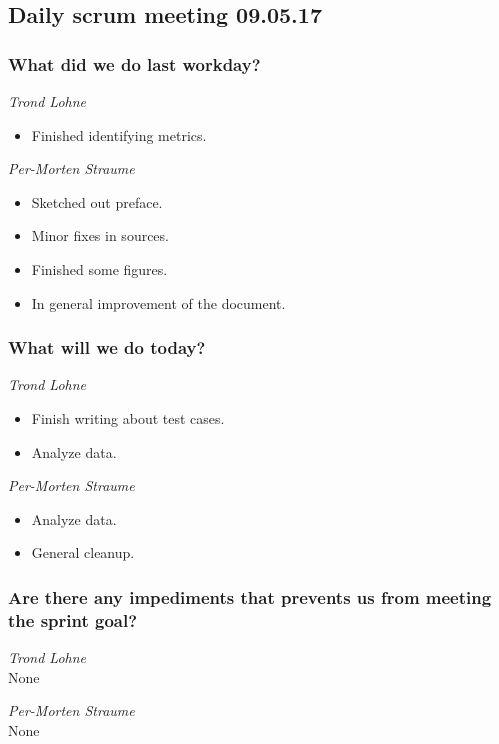 \documentclass{article}
\begin{document}
\begin{center}
\subsection*{Daily scrum meeting 09.05.17}
\end{center}
\bigskip


\subsubsection*{What did we do last workday?}

\noindent\textit{Trond Lohne}
\begin{itemize}
	\item
	Finished identifying metrics.
\end{itemize}

\medskip

\noindent\textit{Per-Morten Straume}
\begin{itemize}
	\item
	Sketched out preface.

	\item
	Minor fixes in sources.

	\item
	Finished some figures.

    \item
    In general improvement of the document.
\end{itemize}


\subsubsection*{What will we do today?}

\noindent\textit{Trond Lohne}
\begin{itemize}
	\item
	Finish writing about test cases.

	\item
	Analyze data.
\end{itemize}

\medskip

\noindent\textit{Per-Morten Straume}
\begin{itemize}
	\item
	Analyze data.

	\item
	General cleanup.
\end{itemize}


\subsubsection*{Are there any impediments that prevents us from meeting the sprint goal?}

\noindent\textit{Trond Lohne}\\
None

\medskip

\noindent\textit{Per-Morten Straume}\\
None
\end{document}
